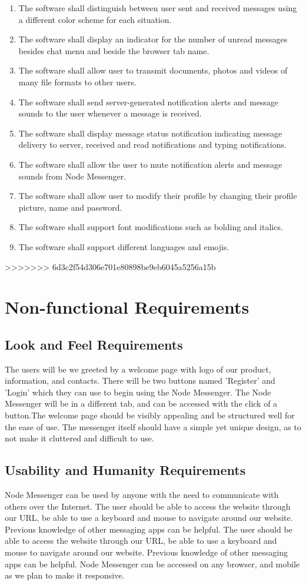 \documentclass[12pt, titlepage]{article}
\begin{document}
\begin{enumerate}
		    \item The software shall distinguish between user sent and received messages using a different color scheme for each situation.
		    \item The software shall display an indicator for the number of unread messages besides chat menu and beside the browser tab name.
		    \item The software shall allow user to transmit documents, photos and videos of many file formats to other users.
		    \item The software shall send server-generated notification alerts and message sounds to the user whenever a message is received.
		    \item The software shall display message status notification indicating message delivery to server, received and read notifications and typing notifications.
		    \item The software shall allow the user to mute notification alerts and message sounds from Node Messenger.
		    \item The software shall allow user to modify their profile by changing their profile picture, name and password.
		    \item The software shall support font modifications such as bolding and italics.
		    \item The software shall support different languages and emojis.
		\end{enumerate}
>>>>>>> 6d3c2f54d306e701e80898be9eb6045a5256a15b
	\newpage
    \section{Non-functional Requirements}

    	\subsection{Look and Feel Requirements}
    	The users will be we greeted by a welcome page with logo of our product, information, and contacts. There will be two buttons named 'Register' and 'Login' which they can use to begin using the Node Messenger. The Node Messenger will be in a different tab, and can be accessed with the click of a button.The welcome page should be visibly appealing and be structured well for the ease of use. The messenger itself should have a simple yet unique design, as to not make it cluttered and difficult to use.

    	\subsection{Usability and Humanity Requirements}
		Node Messenger can be used by anyone with the need to communicate with others over the Internet. The user should be able to access the website through our URL, be able to use a keyboard and mouse to navigate around our website. Previous knowledge of other messaging apps can be helpful. The user should be able to access the website through our URL, be able to use a keyboard and mouse to navigate around our website. Previous knowledge of other messaging apps can be helpful. Node Messenger can be accessed on any browser, and mobile as we plan to make it responsive.
\end{document}

